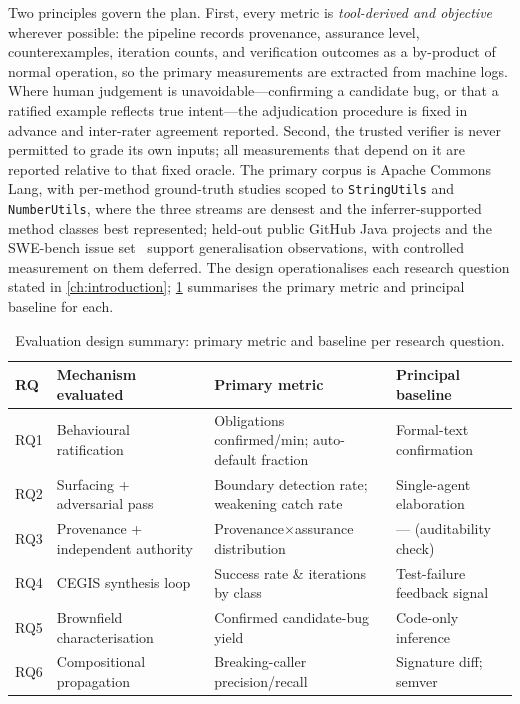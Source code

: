 Two principles govern the plan. First, every metric is \emph{tool-derived and objective} wherever possible: the pipeline records provenance, assurance level, counterexamples, iteration counts, and verification outcomes as a by-product of normal operation, so the primary measurements are extracted from machine logs. Where human judgement is unavoidable---confirming a candidate bug, or that a ratified example reflects true intent---the adjudication procedure is fixed in advance and inter-rater agreement reported. Second, the trusted verifier is never permitted to grade its own inputs; all measurements that depend on it are reported relative to that fixed oracle. The primary corpus is Apache Commons Lang, with per-method ground-truth studies scoped to \texttt{StringUtils} and \texttt{NumberUtils}, where the three streams are densest and the inferrer-supported method classes best represented; held-out public GitHub Java projects and the SWE-bench issue set~\cite{jimenez2024swebench} support generalisation observations, with controlled measurement on them deferred. The design operationalises each research question stated in \cref{ch:introduction}; \cref{tab:a5-eval} summarises the primary metric and principal baseline for each.

\begin{table}[t]
\centering
\caption{Evaluation design summary: primary metric and baseline per research question.}
\label{tab:a5-eval}
\small
\begin{tabular}{@{}llll@{}}
\toprule
RQ & Mechanism evaluated & Primary metric & Principal baseline \\
\midrule
RQ1 & Behavioural ratification        & Obligations confirmed/min; auto-default fraction & Formal-text confirmation \\
RQ2 & Surfacing + adversarial pass    & Boundary detection rate; weakening catch rate    & Single-agent elaboration \\
RQ3 & Provenance + independent authority & Provenance$\times$assurance distribution        & --- (auditability check) \\
RQ4 & CEGIS synthesis loop            & Success rate \& iterations by class              & Test-failure feedback signal \\
RQ5 & Brownfield characterisation     & Confirmed candidate-bug yield                    & Code-only inference \\
RQ6 & Compositional propagation       & Breaking-caller precision/recall                 & Signature diff; semver \\
\bottomrule
\end{tabular}
\end{table}

